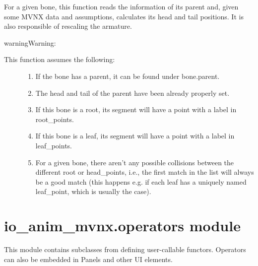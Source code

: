 \documentclass[letterpaper,10pt,english,openany,oneside]{sphinxmanual}
\begin{document}
\begin{fulllineitems}
For a given bone, this function reads the information of its parent and,
given some MVNX data and assumptions, calculates its head and tail
positions. It is also responsible of rescaling the armature.

\begin{sphinxadmonition}{warning}{Warning:}\begin{description}
\item[{This function assumes the following:}] \leavevmode\begin{enumerate}
\def\theenumi{\arabic{enumi}}
\def\labelenumi{\theenumi .}
\makeatletter\def\p@enumii{\p@enumi \theenumi .}\makeatother
\item {} 
If the bone has a parent, it can be found under bone.parent.

\item {} 
The head and tail of the parent have been already properly set.

\item {} 
If this bone is a root, its segment will have a point with
a label in root\_points.

\item {} 
If this bone is a leaf, its segment will have a point with
a label in leaf\_points.

\item {} 
For a given bone, there aren’t any possible collisions between the
different root or head\_points, i.e., the first match in the list
will always be a good match (this happens e.g. if each leaf has
a uniquely named leaf\_point, which is usually the case).

\end{enumerate}

\end{description}
\end{sphinxadmonition}

\end{fulllineitems}



\section{io\_anim\_mvnx.operators module}
\label{\detokenize{io_anim_mvnx:module-io_anim_mvnx.operators}}\label{\detokenize{io_anim_mvnx:io-anim-mvnx-operators-module}}
This module contains subclasses from  defining
user-callable functors. Operators can also be embedded in Panels and
other UI elements.
\end{document}
